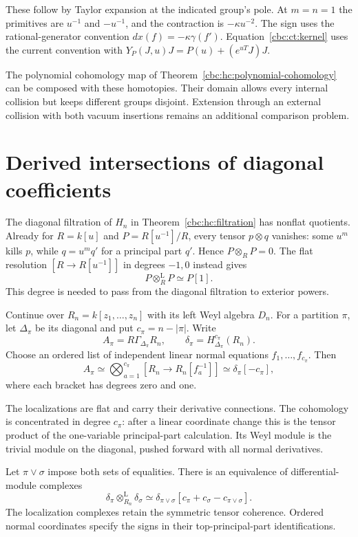 These follow by Taylor expansion at the indicated group's pole.
At $m=n=1$ the primitives are $u^{-1}$ and $-u^{-1}$,
and the contraction is $-\kappa u^{-2}$. The sign uses the
rational-generator convention $dx(f)=-\kappa\gamma(f')$.
Equation~\eqref{cbc:ct:kernel} uses the current convention
with $Y_P(J,u)J=P(u)+(e^{uT}J)J$.

The polynomial cohomology map of
Theorem~\ref{cbc:hc:polynomial-cohomology} can be composed with
these homotopies. Their domain allows every internal collision
but keeps different groups disjoint. Extension through an external
collision with both vacuum insertions remains an additional
comparison problem.

\section{Derived intersections of diagonal coefficients}
\label{cbc:ct:intersections}

The diagonal filtration of $H_n$ in
Theorem~\ref{cbc:hc:filtration} has nonflat quotients. Already
for $R=k[u]$ and $P=R[u^{-1}]/R$, every tensor $p\otimes q$
vanishes: some $u^m$ kills $p$, while $q=u^mq'$ for a
principal part $q'$. Hence $P\otimes_RP=0$. The flat
resolution $[R\to R[u^{-1}]]$ in degrees $-1,0$ instead
gives
\[
 P\otimes_R^{\mathrm L}P\simeq P[1].
\]
This degree is needed to pass from the diagonal filtration to
exterior powers.

Continue over $R_n=k[z_1,\ldots,z_n]$ with its left Weyl
algebra $D_n$. For a partition $\pi$, let $\Delta_\pi$ be
its diagonal and put $c_\pi=n-|\pi|$. Write
\[
 A_\pi=R\Gamma_{\Delta_\pi}R_n,\qquad
 \delta_\pi=H^{c_\pi}_{\Delta_\pi}(R_n).
\]
Choose an ordered list of independent linear normal equations
$f_1,\ldots,f_{c_\pi}$. Then
\begin{equation}\label{cbc:ct:localization}
 A_\pi\simeq\bigotimes_{a=1}^{c_\pi}
     [R_n\longrightarrow R_n[f_a^{-1}]]
       \simeq\delta_\pi[-c_\pi],
\end{equation}
where each bracket has degrees zero and one.

The localizations
are flat and carry their derivative connections. The cohomology
is concentrated in degree $c_\pi$: after a linear coordinate
change this is the tensor product of the one-variable
principal-part calculation. Its Weyl module is the trivial
module on the diagonal, pushed forward with all normal
derivatives.

\begin{proposition}\label{cbc:ct:diagonal-tensor}
Let $\pi\vee\sigma$ impose both sets of equalities. There is
an equivalence of differential-module complexes
\begin{equation}\label{cbc:ct:excess}
 \delta_\pi\otimes_{R_n}^{\mathrm L}\delta_\sigma
 \simeq\delta_{\pi\vee\sigma}
            [c_\pi+c_\sigma-c_{\pi\vee\sigma}].
\end{equation}
The localization complexes retain the symmetric tensor
coherence. Ordered normal coordinates specify the signs in
their top-principal-part identifications.
\end{proposition}

